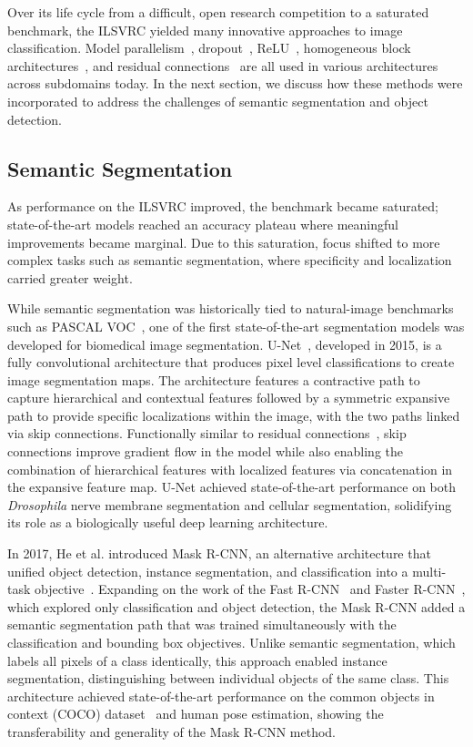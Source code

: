 Over its life cycle from a difficult, open research competition to a saturated benchmark, the ILSVRC yielded many innovative approaches to image classification. Model parallelism~\cite{krizhevsky2012imagenet}, dropout~\cite{hinton2012improving}, ReLU~\cite{glorot2011deep}, homogeneous block architectures~\cite{simonyan2014very}, and residual connections~\cite{he2016deep} are all used in various architectures across subdomains today. In the next section, we discuss how these methods were incorporated to address the challenges of semantic segmentation and object detection.

\subsection{Semantic Segmentation}\label{sec:ch1-segmentation}
As performance on the ILSVRC improved, the benchmark became saturated; state-of-the-art models reached an accuracy plateau where meaningful improvements became marginal. Due to this saturation, focus shifted to more complex tasks such as semantic segmentation, where specificity and localization carried greater weight.

While semantic segmentation was historically tied to natural-image benchmarks such as PASCAL VOC~\cite{everingham2010pascal}, one of the first state-of-the-art segmentation models was developed for biomedical image segmentation. U-Net~\cite{unet}, developed in 2015, is a fully convolutional architecture that produces pixel level classifications to create image segmentation maps. The architecture features a contractive path to capture hierarchical and contextual features followed by a symmetric expansive path to provide specific localizations within the image, with the two paths linked via skip connections. Functionally similar to residual connections~\cite{he2016deep}, skip connections improve gradient flow in the model while also enabling the combination of hierarchical features with localized features via concatenation in the expansive feature map. U-Net achieved state-of-the-art performance on both \textit{Drosophila} nerve membrane segmentation and cellular segmentation, solidifying its role as a biologically useful deep learning architecture.

In 2017, He et al. introduced Mask R-CNN, an alternative architecture that unified object detection, instance segmentation, and classification into a multi-task objective~\cite{he2017mask}. Expanding on the work of the Fast R-CNN~\cite{girshick2015fast} and Faster R-CNN~\cite{ren2016faster}, which explored only classification and object detection, the Mask R-CNN added a semantic segmentation path that was trained simultaneously with the classification and bounding box objectives. Unlike semantic segmentation, which labels all pixels of a class identically, this approach enabled instance segmentation, distinguishing between individual objects of the same class. This architecture achieved state-of-the-art performance on the common objects in context (COCO) dataset~\cite{lin2014microsoft} and human pose estimation, showing the transferability and generality of the Mask R-CNN method.

